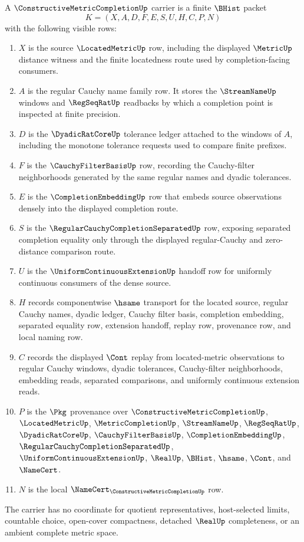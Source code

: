 \begin{definition}
\label{def:constructive-metric-completion-carrier}
A $\ConstructiveMetricCompletionUp$ carrier is a finite $\BHist$ packet
$$
K=(X,A,D,F,E,S,U,H,C,P,N)
$$
with the following visible rows:
\begin{enumerate}
\item $X$ is the source $\LocatedMetricUp$ row, including the displayed $\MetricUp$ distance witness and the finite locatedness route used by completion-facing consumers.
\item $A$ is the regular Cauchy name family row. It stores the $\StreamNameUp$ windows and $\RegSeqRatUp$ readbacks by which a completion point is inspected at finite precision.
\item $D$ is the $\DyadicRatCoreUp$ tolerance ledger attached to the windows of $A$, including the monotone tolerance requests used to compare finite prefixes.
\item $F$ is the $\CauchyFilterBasisUp$ row, recording the Cauchy-filter neighborhoods generated by the same regular names and dyadic tolerances.
\item $E$ is the $\CompletionEmbeddingUp$ row that embeds source observations densely into the displayed completion route.
\item $S$ is the $\RegularCauchyCompletionSeparatedUp$ row, exposing separated completion equality only through the displayed regular-Cauchy and zero-distance comparison route.
\item $U$ is the $\UniformContinuousExtensionUp$ handoff row for uniformly continuous consumers of the dense source.
\item $H$ records componentwise $\hsame$ transport for the located source, regular Cauchy names, dyadic ledger, Cauchy filter basis, completion embedding, separated equality row, extension handoff, replay row, provenance row, and local naming row.
\item $C$ records the displayed $\Cont$ replay from located-metric observations to regular Cauchy windows, dyadic tolerances, Cauchy-filter neighborhoods, embedding reads, separated comparisons, and uniformly continuous extension reads.
\item $P$ is the $\Pkg$ provenance over $\ConstructiveMetricCompletionUp$, $\LocatedMetricUp$, $\MetricCompletionUp$, $\StreamNameUp$, $\RegSeqRatUp$, $\DyadicRatCoreUp$, $\CauchyFilterBasisUp$, $\CompletionEmbeddingUp$, $\RegularCauchyCompletionSeparatedUp$, $\UniformContinuousExtensionUp$, $\RealUp$, $\BHist$, $\hsame$, $\Cont$, and $\NameCert$.
\item $N$ is the local $\NameCert_{\ConstructiveMetricCompletionUp}$ row.
\end{enumerate}
The carrier has no coordinate for quotient representatives, host-selected limits, countable choice, open-cover compactness, detached $\RealUp$ completeness, or an ambient complete metric space.
\end{definition}

